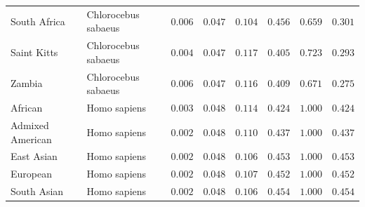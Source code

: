 \documentclass{article}
\begin{document}
\begin{center}
\begin{longtable*}{|l|l|r|r|r|r|r|r|}
            South Africa & Chlorocebus sabaeus &               $ 0.006$ &             $ 0.047$ &              $ 0.104$ &                                     $ 0.456$ &                       $ 0.659$ &                 $ 0.301$ \\
            Saint Kitts & Chlorocebus sabaeus &               $ 0.004$ &             $ 0.047$ &              $ 0.117$ &                                     $ 0.405$ &                       $ 0.723$ &                 $ 0.293$ \\
            Zambia & Chlorocebus sabaeus &               $ 0.006$ &             $ 0.047$ &              $ 0.116$ &                                     $ 0.409$ &                       $ 0.671$ &                 $ 0.275$ \\
            African &        Homo sapiens &               $ 0.003$ &             $ 0.048$ &              $ 0.114$ &                                     $ 0.424$ &                       $ 1.000$ &                 $ 0.424$ \\
            Admixed American &        Homo sapiens &               $ 0.002$ &             $ 0.048$ &              $ 0.110$ &                                     $ 0.437$ &                       $ 1.000$ &                 $ 0.437$ \\
            East Asian &        Homo sapiens &               $ 0.002$ &             $ 0.048$ &              $ 0.106$ &                                     $ 0.453$ &                       $ 1.000$ &                 $ 0.453$ \\
            European &        Homo sapiens &               $ 0.002$ &             $ 0.048$ &              $ 0.107$ &                                     $ 0.452$ &                       $ 1.000$ &                 $ 0.452$ \\
            South Asian &        Homo sapiens &               $ 0.002$ &             $ 0.048$ &              $ 0.106$ &                                     $ 0.454$ &                       $ 1.000$ &                 $ 0.454$ \\
        \end{longtable*}
    \end{center}
\end{document}

